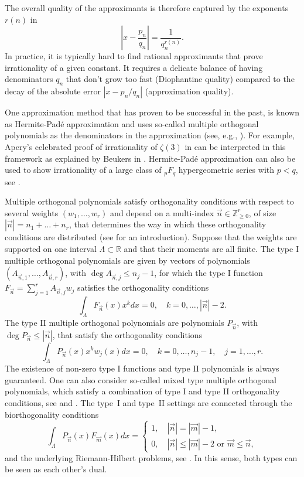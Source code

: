 \documentclass[a4paper,12pt,oneside]{article}
\theoremstyle{definition}
\newcommand{\Z}{\mathbb{Z}}
\newcommand{\R}{\mathbb{R}}
\newcommand{\sz}[1]{\left| \vec{#1} \right|}
\begin{document}
The overall quality of the approximants is therefore captured by the exponents $r(n)$ in    
$$ \left| x - \frac{p_n}{q_n} \right| = \frac{1}{q_n^{r(n)}}. $$
In practice, it is typically hard to find rational approximants that prove irrationality of a given constant. It requires a delicate balance of having denominators $q_n$ that don't grow too fast (Diophantine quality) compared to the decay of the absolute error $\left| x - p_n/q_n \right|$ (approximation quality).
\medbreak

One approximation method that has proven to be successful in the past, is known as Hermite-Padé approximation and uses so-called multiple orthogonal polynomials as the denominators in the approximation (see, e.g., \cite{VA}). For example, Apery's celebrated proof of irrationality of $\zeta(3)$ in \cite{Apery} can be interpreted in this framework as explained by Beukers in \cite{Beukers}. Hermite-Padé approximation can also be used to show irrationality of a large class of ${}_pF_q$ hypergeometric series with $p<q$, see \cite{Wolfs}.

Multiple orthogonal polynomials satisfy orthogonality conditions with respect to several weights $(w_1,\dots,w_r)$ and depend on a multi-index $\vec{n}\in\Z_{\geq 0}^r$, of size $\sz{n}=n_1+\dots+n_r$, that determines the way in which these orthogonality conditions are distributed (see \cite[Chapter 23]{Ismail} for an introduction). Suppose that the weights are supported on one interval $\Lambda\subset\R$ and that their moments are all finite. The type I multiple orthogonal polynomials are given by vectors of polynomials $(A_{\vec{n},1},\dots,A_{\vec{n},r})$, with $\deg A_{\vec{n},j}\leq n_j-1$, for which the type I function $F_{\vec{n}} = \sum_{j=1}^r A_{\vec{n},j} w_j $ satisfies the orthogonality conditions
    $$\int_{\Lambda} F_{\vec{n}}(x) x^k dx = 0,\quad k=0,\dots,\sz{n}-2.$$
The type II multiple orthogonal polynomials are polynomials $P_{\vec{n}}$, with $\deg P_{\vec{n}}\leq \sz{n}$, that satisfy the orthogonality conditions
    $$\int_{\Lambda} P_{\vec{n}}(x) x^k w_j(x) dx = 0,\quad k=0,\dots,n_j-1,\quad j=1,\dots,r.$$
The existence of non-zero type I functions and type II polynomials is always guaranteed. One can also consider so-called mixed type multiple orthogonal polynomials, which satisfy a combination of type I and type II orthogonality conditions, see \cite{Sor_mixed} and \cite{DaemsKuijl}. The type~I and type~II settings are connected through the biorthogonality conditions
    $$ \int_{\Lambda} P_{\vec{n}}(x) F_{\vec{m}}(x) dx = \begin{cases}
        1,\quad \sz{n}=\sz{m}-1, \\
        0,\quad \sz{n}\leq \sz{m}-2 \text{ or } \vec{m}\leq\vec{n},
    \end{cases}  $$
and the underlying Riemann-Hilbert problems, see \cite{G-K-VA}. In this sense, both types can be seen as each other's dual.
\medbreak
\end{document}
